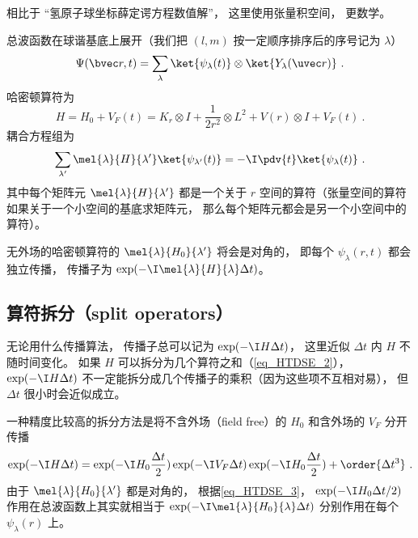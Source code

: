 
\begin{issues}
\issueDraft
\end{issues}


相比于 “氢原子球坐标薛定谔方程数值解”， 这里使用张量积空间， 更数学。

总波函数在球谐基底上展开（我们把 $(l,m)$ 按一定顺序排序后的序号记为 $\lambda$）
\begin{equation}\label{eq_HTDSE_1}
\Psi(\bvec r, t) = \sum_\lambda \ket{\psi_\lambda(t)} \otimes \ket{Y_\lambda(\uvec r)}~.
\end{equation}
哈密顿算符为
\begin{equation}\label{eq_HTDSE_2}
H = H_0 + V_F(t) = K_r\otimes I + \frac{1}{2r^2}\otimes L^2 + V(r) \otimes I + V_F(t)~.
\end{equation}
耦合方程组为
\begin{equation}\label{eq_HTDSE_3}
\sum_{\lambda'} \mel{\lambda}{H}{\lambda'} \ket{\psi_{\lambda'}(t)} = -\I\pdv{t} \ket{\psi_\lambda(t)}~.
\end{equation}
其中每个矩阵元 $ \mel{\lambda}{H}{\lambda'}$ 都是一个关于 $r$ 空间的算符（张量空间的算符如果关于一个小空间的基底求矩阵元， 那么每个矩阵元都会是另一个小空间中的算符）。

无外场的哈密顿算符的 $\mel{\lambda}{H_0}{\lambda'}$ 将会是对角的， 即每个 $\psi_{\lambda}(r, t)$ 都会独立传播， 传播子为 $\exp(-\I \mel{\lambda}{H}{\lambda} \Delta t)$。

\subsection{算符拆分（split operators）}
无论用什么传播算法， 传播子总可以记为 $\exp(-\I H \Delta t)$， 这里近似 $\Delta t$ 内 $H$ 不随时间变化。 如果 $H$ 可以拆分为几个算符之和（\autoref{eq_HTDSE_2}）， $\exp(-\I H \Delta t)$ 不一定能拆分成几个传播子的乘积（因为这些项不互相对易）， 但 $\Delta t$ 很小时会近似成立。

一种精度比较高的拆分方法是将不含外场（field free）的 $H_0$ 和含外场的 $V_F$ 分开传播
\begin{equation}
\exp(-\I H\Delta t) = \exp(-\I H_0\frac{\Delta t}{2})\exp(-\I V_F\Delta t) \exp(-\I H_0\frac{\Delta t}{2}) + \order{\Delta t^3}~.
\end{equation}
由于 $\mel{\lambda}{H_0}{\lambda'}$ 都是对角的， 根据\autoref{eq_HTDSE_3}， $\exp(-\I H_0 \Delta t/2)$ 作用在总波函数上其实就相当于 $\exp(-\I\mel{\lambda}{H_0}{\lambda} \Delta t)$ 分别作用在每个 $\psi_{\lambda}(r)$ 上。

